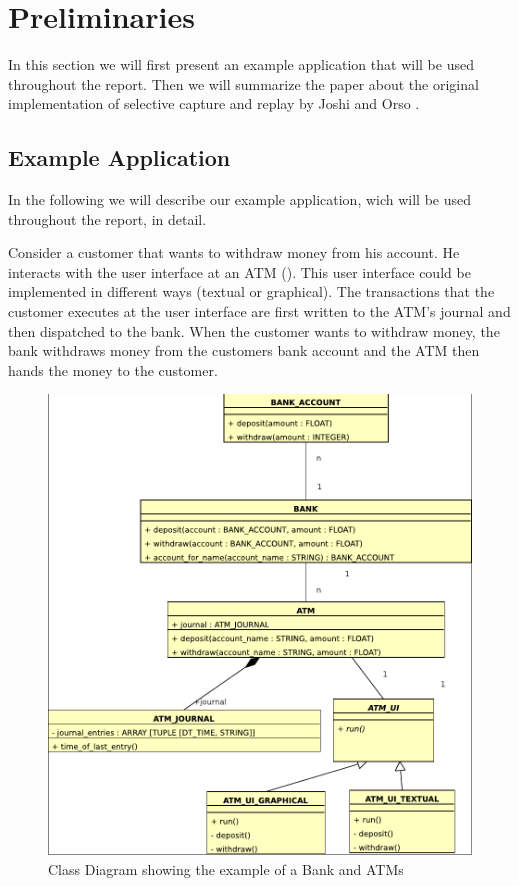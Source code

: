 \chapter{Preliminaries}
In this section we will first present an example application that will be used throughout the report. Then we will summarize the paper about the original implementation of selective capture and replay by Joshi and Orso \cite{orso05may}.


\section{Example Application}
In the following we will describe our example application, wich will be used throughout the report, in detail.

Consider a customer that wants to withdraw money from his account. He interacts with the user interface at an ATM (). This user interface could be implemented in different ways (textual or graphical). The transactions that the customer executes at the user interface are first written to the ATM's journal and then dispatched to the bank. When the customer wants to withdraw money, the bank withdraws money from the customers bank account and the ATM then hands the money to the customer.
 \begin{figure}[ht]
   \centering
   \includegraphics[width=1\textwidth]{illustrations/example_class_diagram}
   \caption{Class Diagram showing the example of a Bank and ATMs}
   \label{fig:example_class_diagram}
\end{figure}


